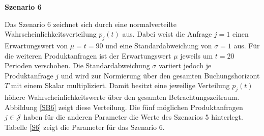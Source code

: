\textbf{Szenario 6}

Das Szenario 6 zeichnet sich durch eine normalverteilte Wahrscheinlichkeitsverteilung $p_j(t)$ aus. Dabei weist die Anfrage $j=1$ einen Erwartungswert von $\mu=t=90$ und eine Standardabweichung von $\sigma=1$ aus. Für die weiteren Produktanfragen ist der Erwartungswert $\mu$ jeweils um $t=20$ Perioden verschoben. Die Standardabweichung $\sigma$ variiert jedoch je Produktanfrage $j$ und wird zur Normierung über den gesamten Buchungshorizont $T$ mit einem Skalar multipliziert. Damit besitzt eine jeweilige Verteilung $p_j(t)$ höhere Wahrscheinlichkeitswerte über den gesamten Betrachtungszeitraum. Abbildung \ref{SB6} zeigt diese Verteilung. Die fünf möglichen Produktanfragen $j\in\mathcal{J}$ haben für die anderen Parameter die Werte des Szenarios 5 hinterlegt. Tabelle \ref{S6} zeigt die Parameter für das Szenario 6.

